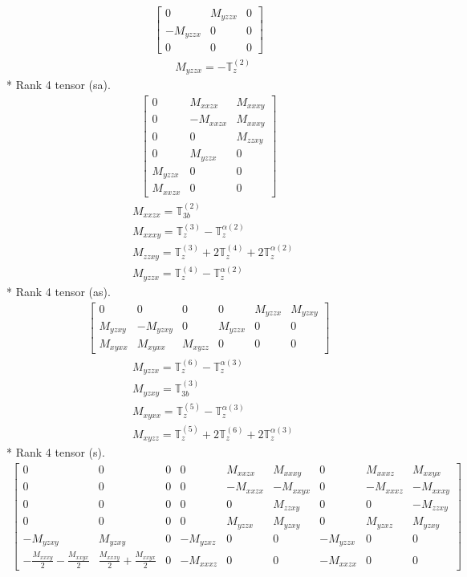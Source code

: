 \documentclass[fleqn,8pt,landscape]{jsarticle}
\begin{document}
\begin{align*}
\begin{bmatrix} 0 & M_{yzzx} & 0 \\ - M_{yzzx} & 0 & 0 \\ 0 & 0 & 0 \end{bmatrix}
\end{align*}
\begin{align*}
& M_{yzzx} = - \mathbb{T}_{z}^{(2)}
\end{align*}
* Rank 4 tensor (sa).
\begin{align*}
\begin{bmatrix} 0 & M_{xxzx} & M_{xxxy} \\ 0 & - M_{xxzx} & M_{xxxy} \\ 0 & 0 & M_{zzxy} \\ 0 & M_{yzzx} & 0 \\ M_{yzzx} & 0 & 0 \\ M_{xxzx} & 0 & 0 \end{bmatrix}
\end{align*}
\begin{align*}
& M_{xxzx} = \mathbb{T}_{3b}^{(2)} \\
& M_{xxxy} = \mathbb{T}_{z}^{(3)} - \mathbb{T}_{z}^{\alpha(2)} \\
& M_{zzxy} = \mathbb{T}_{z}^{(3)} + 2 \mathbb{T}_{z}^{(4)} + 2 \mathbb{T}_{z}^{\alpha(2)} \\
& M_{yzzx} = \mathbb{T}_{z}^{(4)} - \mathbb{T}_{z}^{\alpha(2)}
\end{align*}
* Rank 4 tensor (as).
\begin{align*}
\begin{bmatrix} 0 & 0 & 0 & 0 & M_{yzzx} & M_{yzxy} \\ M_{yzxy} & - M_{yzxy} & 0 & M_{yzzx} & 0 & 0 \\ M_{xyxx} & M_{xyxx} & M_{xyzz} & 0 & 0 & 0 \end{bmatrix}
\end{align*}
\begin{align*}
& M_{yzzx} = \mathbb{T}_{z}^{(6)} - \mathbb{T}_{z}^{\alpha(3)} \\
& M_{yzxy} = \mathbb{T}_{3b}^{(3)} \\
& M_{xyxx} = \mathbb{T}_{z}^{(5)} - \mathbb{T}_{z}^{\alpha(3)} \\
& M_{xyzz} = \mathbb{T}_{z}^{(5)} + 2 \mathbb{T}_{z}^{(6)} + 2 \mathbb{T}_{z}^{\alpha(3)}
\end{align*}
* Rank 4 tensor (s).
\begin{align*}
\begin{bmatrix} 0 & 0 & 0 & 0 & M_{xxzx} & M_{xxxy} & 0 & M_{xxxz} & M_{xxyx} \\ 0 & 0 & 0 & 0 & - M_{xxzx} & - M_{xxyx} & 0 & - M_{xxxz} & - M_{xxxy} \\ 0 & 0 & 0 & 0 & 0 & M_{zzxy} & 0 & 0 & - M_{zzxy} \\ 0 & 0 & 0 & 0 & M_{yzzx} & M_{yzxy} & 0 & M_{yzxz} & M_{yzxy} \\ - M_{yzxy} & M_{yzxy} & 0 & - M_{yzxz} & 0 & 0 & - M_{yzzx} & 0 & 0 \\ - \frac{M_{xxxy}}{2} - \frac{M_{xxyx}}{2} & \frac{M_{xxxy}}{2} + \frac{M_{xxyx}}{2} & 0 & - M_{xxxz} & 0 & 0 & - M_{xxzx} & 0 & 0 \end{bmatrix}
\end{align*}
\end{document}
